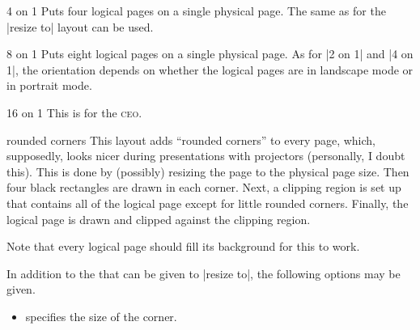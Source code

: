 \begin{pgflayout}{4 on 1}
    Puts four logical pages on a single physical page. The same 
    as for the |resize to| layout can be used.
\end{pgflayout}

\begin{pgflayout}{8 on 1}
    Puts eight logical pages on a single physical page. As for |2 on 1| and
    |4 on 1|, the orientation depends on whether the logical pages are in
    landscape mode or in portrait mode.
\end{pgflayout}

\begin{pgflayout}{16 on 1}
    This is for the \textsc{ceo}.
\end{pgflayout}

\begin{pgflayout}{rounded corners}
\label{layout-rounded-corners}
    This layout adds ``rounded corners'' to every page, which, supposedly,
    looks nicer during presentations with projectors (personally, I doubt
    this). This is done by (possibly) resizing the page to the physical page
    size. Then four black rectangles are drawn in each corner. Next, a clipping
    region is set up that contains all of the logical page except for little
    rounded corners. Finally, the logical page is drawn and clipped against the
    clipping region.

    Note that every logical page should fill its background for this to work.

    In addition to the  that can be given to |resize to|, the
    following options may be given.
    \begin{itemize}
        \item {} specifies the size of the
            corner.
    \end{itemize}
\end{pgflayout}

